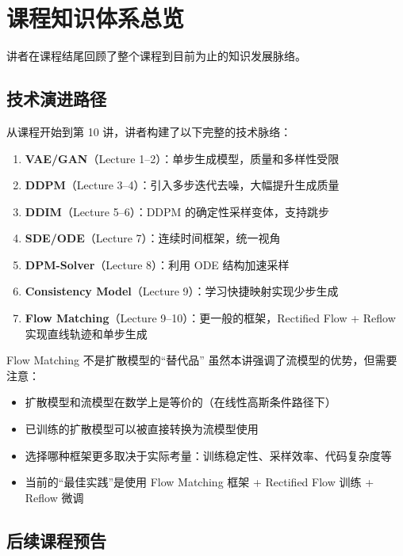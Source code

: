 \section{课程知识体系总览}

讲者在课程结尾回顾了整个课程到目前为止的知识发展脉络。

\subsection{技术演进路径}

从课程开始到第 10 讲，讲者构建了以下完整的技术脉络：

\begin{enumerate}
    \item \textbf{VAE/GAN}（Lecture 1--2）：单步生成模型，质量和多样性受限
    \item \textbf{DDPM}（Lecture 3--4）：引入多步迭代去噪，大幅提升生成质量
    \item \textbf{DDIM}（Lecture 5--6）：DDPM 的确定性采样变体，支持跳步
    \item \textbf{SDE/ODE}（Lecture 7）：连续时间框架，统一视角
    \item \textbf{DPM-Solver}（Lecture 8）：利用 ODE 结构加速采样
    \item \textbf{Consistency Model}（Lecture 9）：学习快捷映射实现少步生成
    \item \textbf{Flow Matching}（Lecture 9--10）：更一般的框架，Rectified Flow + Reflow 实现直线轨迹和单步生成
\end{enumerate}

\begin{warningbox}{Flow Matching 不是扩散模型的``替代品''}
虽然本讲强调了流模型的优势，但需要注意：
\begin{itemize}
    \item 扩散模型和流模型在数学上是等价的（在线性高斯条件路径下）
    \item 已训练的扩散模型可以被直接转换为流模型使用
    \item 选择哪种框架更多取决于实际考量：训练稳定性、采样效率、代码复杂度等
    \item 当前的``最佳实践''是使用 Flow Matching 框架 + Rectified Flow 训练 + Reflow 微调
\end{itemize}
\end{warningbox}

\subsection{后续课程预告}

